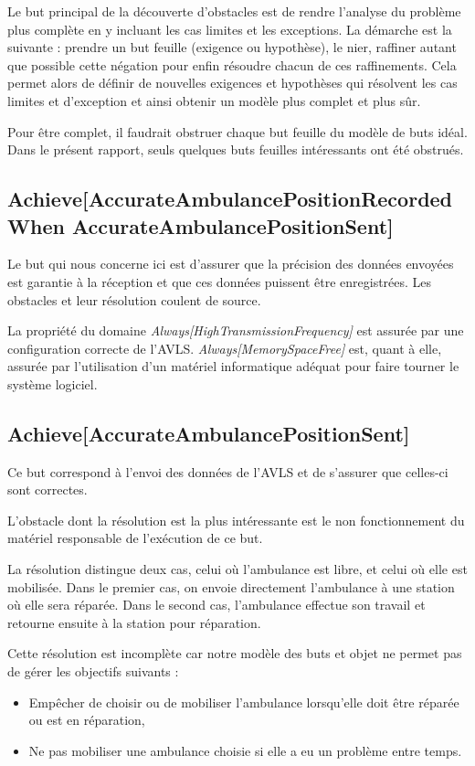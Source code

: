 Le but principal de la découverte d'obstacles est de rendre l'analyse du 
problème plus complète en y incluant les cas limites et les exceptions.  La 
démarche est la suivante : prendre un but feuille (exigence ou hypothèse), 
le nier, raffiner autant que possible cette négation pour enfin résoudre chacun 
de ces raffinements.  Cela permet alors de définir de nouvelles exigences et 
hypothèses qui résolvent les cas limites et d'exception et ainsi obtenir un 
modèle plus complet et plus sûr.

Pour être complet, il faudrait obstruer chaque but feuille du modèle de buts 
idéal.  Dans le présent rapport, seuls quelques buts feuilles intéressants ont 
été obstrués.

\subsection{Achieve[AccurateAmbulancePositionRecorded When AccurateAmbulancePositionSent]}
	Le but qui nous concerne ici est d'assurer que la précision des
	données envoyées est garantie à la réception et que ces données
	puissent être enregistrées. Les obstacles et leur résolution coulent 
	de source.
	
	La propriété du domaine \emph{Always[HighTransmissionFrequency]} est assurée 
	par une configuration correcte de l'AVLS.  \emph{Always[MemorySpaceFree]} 
	est, quant à elle, assurée par l'utilisation d'un matériel informatique 
	adéquat pour faire tourner le système logiciel. 

\subsection{Achieve[AccurateAmbulancePositionSent]}
	Ce but correspond à l'envoi des données de l'AVLS et de s'assurer
	que celles-ci sont correctes. 

	L'obstacle dont la résolution est la plus intéressante est le non
	fonctionnement du matériel responsable de l'exécution de ce but.

	La résolution distingue deux cas, celui où l'ambulance est libre, et celui
	où elle est mobilisée. Dans le premier cas, on envoie directement
	l'ambulance à une station où elle sera réparée. Dans le second
	cas, l'ambulance effectue son travail et retourne ensuite à la 
	station pour réparation.

	Cette résolution est incomplète car notre modèle des buts et objet
	ne permet pas de gérer les objectifs suivants : 
	\begin{itemize}
		\item Empêcher de choisir ou de mobiliser l'ambulance lorsqu'elle
		doit être réparée ou est en réparation,
		\item Ne pas mobiliser une ambulance choisie si elle a eu un
		problème entre temps.
	\end{itemize}

